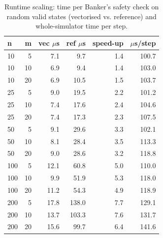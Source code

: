 \begin{table}[!htb]
\centering
\footnotesize
\caption{Runtime scaling: time per Banker's safety check on random valid states (vectorised vs. reference) and whole-simulator time per step.}
\label{tab:scaling}
\begin{tabular}{lrrrrr}
\toprule
n & m & vec $\mu$s & ref $\mu$s & speed-up & $\mu$s/step \\
\midrule
10 & 5 & 7.1 & 9.7 & 1.4 & 100.7 \\
10 & 10 & 6.9 & 9.4 & 1.4 & 103.0 \\
10 & 20 & 6.9 & 10.5 & 1.5 & 103.7 \\
25 & 5 & 9.0 & 19.5 & 2.2 & 101.2 \\
25 & 10 & 7.4 & 17.6 & 2.4 & 104.6 \\
25 & 20 & 7.4 & 17.3 & 2.3 & 107.5 \\
50 & 5 & 9.1 & 29.6 & 3.3 & 102.1 \\
50 & 10 & 8.1 & 28.4 & 3.5 & 113.3 \\
50 & 20 & 9.0 & 28.6 & 3.2 & 118.8 \\
100 & 5 & 12.1 & 60.8 & 5.0 & 110.0 \\
100 & 10 & 9.9 & 51.9 & 5.3 & 118.0 \\
100 & 20 & 11.2 & 54.3 & 4.9 & 118.9 \\
200 & 5 & 17.8 & 138.0 & 7.7 & 129.1 \\
200 & 10 & 13.7 & 103.3 & 7.6 & 131.7 \\
200 & 20 & 15.6 & 99.7 & 6.4 & 141.6 \\
\bottomrule
\end{tabular}
\end{table}
